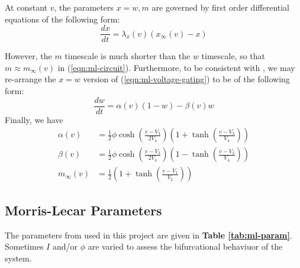 \documentclass[letterpaper,12pt]{article}
\numberwithin{table}{section}
\numberwithin{figure}{section}
\numberwithin{equation}{section}
\newcommand*{\deriv}[2]{\frac{d #1}{d #2}}
\newcommand{\reftab}[1]{\textbf{Table \ref{#1}}}
\begin{document}
\begin{flushleft}
    At constant $v$, the parameters $x = w, m$ are governed by first order differential equations of the following form:
    \begin{equation}
        \label{eqn:ml-voltage-gating}
        \deriv{x}{t} = \lambda_x(v) (x_\infty(v) - x)
    \end{equation}
    
    However, the $m$ timescale is much shorter than the $w$ timescale, so that $m \approx m_\infty(v)$ in (\ref{eqn:ml-circuit}). Furthermore, to be consistent with \cite{snm}, we may re-arrange the $x = w$ version of (\ref{eqn:ml-voltage-gating}) to be of the following form:
    \begin{equation}
        \label{eqn:w-dyn}
        \deriv{w}{t} = \alpha(v)(1  - w) - \beta(v)w
    \end{equation}
    Finally, we have
    \begin{align}
        \label{eqn:alpha-def}
        \alpha(v) &= \frac{1}{2} \phi \cosh{\left(\frac{v - V_3}{2V_4}\right)}\left(1 + \tanh{\left(\frac{v - V_3}{V_4}\right)}\right) \\
        \label{eqn:beta-def}
        \beta(v) &= \frac{1}{2} \phi \cosh{\left(\frac{v - V_3}{2V_4}\right)}\left(1 - \tanh{\left(\frac{v - V_3}{V_4}\right)}\right) \\
        m_\infty(v) &= \frac{1}{2}\left(1 + \tanh{\left(\frac{v - V_1}{V_2}\right)}\right)
    \end{align}

    \subsection{Morris-Lecar Parameters}

    The parameters from \cite{snm} used in this project are given in \reftab{tab:ml-param}. Sometimes $I$ and/or $\phi$ are varied to assess the bifurcational behaviuor of the system.

    \begin{table}[h]

        \begin{subtable}{0.49\linewidth}

            \centering


\end{subtable}
\end{table}
\end{flushleft}
\end{document}
